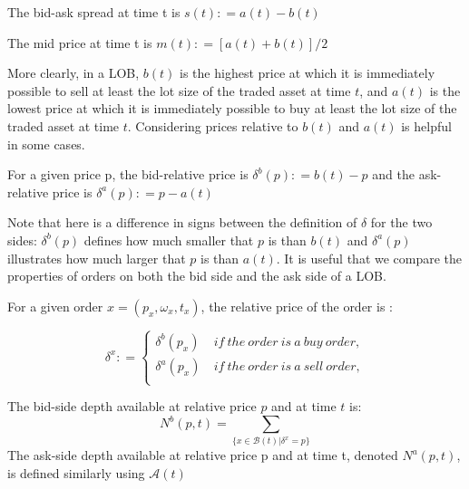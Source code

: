 \begin{defn}\cite{gould2013limit}
The bid-ask spread at time t is $s(t): =a(t)-b(t)$
\end{defn}

\begin{defn}\cite{gould2013limit}
The mid price at time t is $m(t): =[a(t)+b(t)]/2$
\end{defn}

More clearly,  in a LOB,  $b(t)$ is the highest price at which it is immediately possible to sell at least the lot size of the traded asset at time $t$,  and $a(t)$ is the lowest price at which it is immediately possible to buy at least the lot size of the traded asset at time $t$. Considering prices relative to $b(t)$ and $a(t)$ is helpful in some cases.

\begin{defn}\cite{gould2013limit}
For a given price p,  the bid-relative price is $\delta^b(p): =b(t)-p$ and the ask-relative price is $\delta^a(p): = p-a(t)$ 
\end{defn}

Note that here is a difference in signs between the definition of $\delta$ for the two sides: $\delta^b(p)$ defines how much smaller that $p$ is than $b(t)$ and $\delta^a(p)$ illustrates how much larger that $p$ is than $a(t)$. It is useful that we compare the properties of orders on both the bid side and the ask side of a LOB. 

\begin{defn}\cite{gould2013limit}
For a given order $x=(p_x, \omega_x , t_x)$,  the relative price of the order is : 

\begin{equation*}
\delta^x: =\left\{
\begin{aligned}
\delta^b(p_x)&\ if\ the\ order\ is\ a\ buy\ order, \\
\delta^a(p_x)&\ if\ the\ order\ is\ a\ sell\ order, \\
\end{aligned}
\right.
\end{equation*}

\end{defn}

\begin{defn}\cite{gould2013limit}
The bid-side depth available at relative price $p$ and at time $t$ is: 
\begin{equation*}
N^b(p, t)=\sum_{\{x\in \mathcal{B}(t)|\delta^x=p\}}
\end{equation*}
The ask-side depth available at relative price p and at time t,  denoted $N^a(p, t)$,  is defined similarly using $\mathcal{A}(t)$
\end{defn}

